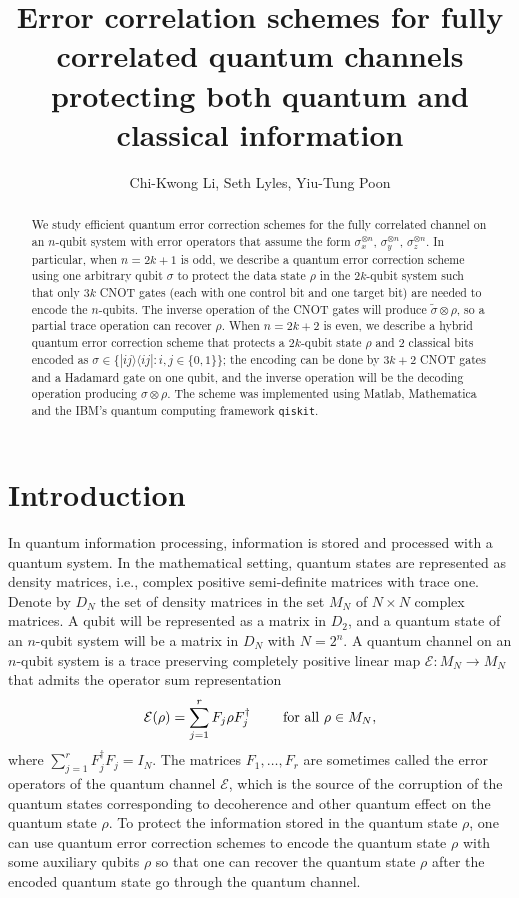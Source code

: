 \documentclass[11pt]{article}
\def\cE{{\mathcal E}}
\def\ra{{\rangle}}
\def\la{{\langle}}
\begin{document}
\jot

\title{Error correlation schemes for fully correlated quantum channels
protecting both quantum and classical information}


\author{Chi-Kwong Li, Seth Lyles, Yiu-Tung Poon}
\date{}
\maketitle
\begin{abstract}
We study efficient quantum error correction schemes
for the fully correlated channel on an
$n$-qubit system with error operators
that assume the form $\sigma_x^{\otimes n}$, $\sigma_y^{\otimes n}$, 
$\sigma_z^{\otimes n}$.
In particular, when $n=2k+1$ is odd, we describe a quantum error correction scheme 
using one arbitrary qubit $\sigma$
to protect the data state $\rho$ in the $2k$-qubit system
such that only $3k$ CNOT gates (each with one control bit and one target bit) 
are needed
to encode the $n$-qubits. The inverse operation of the CNOT gates
will produce $\tilde \sigma \otimes \rho$, so a partial 
trace operation can recover $\rho$.
When $n = 2k+2$ is even, we describe a hybrid quantum error correction scheme
that protects a $2k$-qubit state $\rho$
and 2 classical bits encoded as $\sigma \in \{|ij\ra \la ij|: i, j \in \{0,1\}\}$;
the encoding can be done by $3k+2$ CNOT gates and a Hadamard gate on one qubit,
and the inverse operation will be the decoding operation producing 
$\sigma \otimes \rho$.
The scheme was implemented using Matlab, Mathematica and
the IBM's quantum computing framework \verb|qiskit|.

\end{abstract}

\noindent
\section{Introduction}


In quantum information processing, information is stored and processed
with a quantum system. In the mathematical setting,  quantum states are
represented as density matrices, i.e., complex positive semi-definite matrices
with trace one. Denote by $D_N$ the set of density matrices in the set 
$M_N$ of $N\times N$ complex matrices. A qubit will be represented as a
matrix in $D_2$, and a quantum state of an $n$-qubit system will be a matrix
in $D_N$ with $N = 2^n$.
A quantum channel on an $n$-qubit system is a
trace preserving completely positive linear map
$\cE: M_N\rightarrow M_N$ that admits the operator sum representation
$$\cE(\rho) = \sum_{j=1}^r F_j \rho F_j^\dag  \qquad \hbox{ for all } \rho \in M_N,$$
where $\sum_{j=1}^r F_j^\dag F_j = I_N$. The matrices $F_1, \dots, F_r$ are sometimes 
called the error operators of the quantum channel $\cE$, which is the source of the
corruption of the quantum states corresponding to decoherence and other quantum effect
on the quantum state $\rho$. To protect the information stored in the quantum state
$\rho$, one can use quantum error correction schemes to encode the
quantum state $\rho$ with some auxiliary qubits $\rho$  
so that one can recover the quantum state $\rho$ after the encoded 
quantum state go through the quantum channel.
\end{document}
